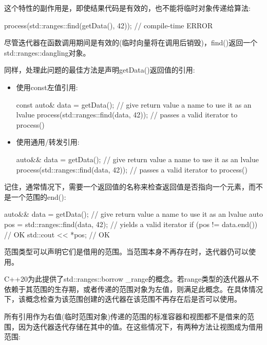 这个特性的副作用是，即使结果代码是有效的，也不能将临时对象传递给算法:

\begin{cpp}
process(std::ranges::find(getData(), 42)); // compile-time ERROR
\end{cpp}

尽管迭代器在函数调用期间是有效的(临时向量将在调用后销毁)，find()返回一个std::ranges::dangling对象。

同样，处理此问题的最佳方法是声明getData()返回值的引用:

\begin{itemize}
\item
使用const左值引用:

\begin{cpp}
const auto& data = getData(); // give return value a name to use it as an lvalue
process(std::ranges::find(data, 42)); // passes a valid iterator to process()
\end{cpp}

\item
使用通用/转发引用:

\begin{cpp}
auto&& data = getData(); // give return value a name to use it as an lvalue
process(std::ranges::find(data, 42)); // passes a valid iterator to process()
\end{cpp}
\end{itemize}

记住，通常情况下，需要一个返回值的名称来检查返回值是否指向一个元素，而不是一个范围的end():

\begin{cpp}
auto&& data = getData(); // give return value a name to use it as an lvalue
auto pos = std::ranges::find(data, 42); // yields a valid iterator
if (pos != data.end()) { // OK
	std::cout << *pos; // OK
}
\end{cpp}


范围类型可以声明它们是借用的范围。当范围本身不再存在时，迭代器仍可以使用。

C++20为此提供了std::ranges::borrow \_range的概念。若range类型的迭代器从不依赖于其范围的生存期，或者传递的范围对象为左值，则满足此概念。在具体情况下，该概念检查为该范围创建的迭代器在该范围不再存在后是否可以使用。

所有引用作为右值(临时范围对象)传递的范围的标准容器和视图都不是借来的范围，因为迭代器迭代存储在其中的值。在这些情况下，有两种方法让视图成为借用范围:

